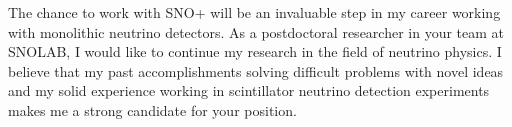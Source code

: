 \documentclass[10pt]{article} %
\begin{document}
%

The chance to work with SNO+ will be an invaluable step in my career working
with monolithic neutrino detectors. As a postdoctoral researcher in your team
at SNOLAB, I would like to continue my research in the field of neutrino
physics. I believe that my past accomplishments solving difficult problems with
novel ideas and my solid experience working in scintillator neutrino detection
experiments makes me a strong candidate for your position. 


\clearpage
\renewcommand\refname{Publications} %

\nocite{*} %
%
\end{document}
